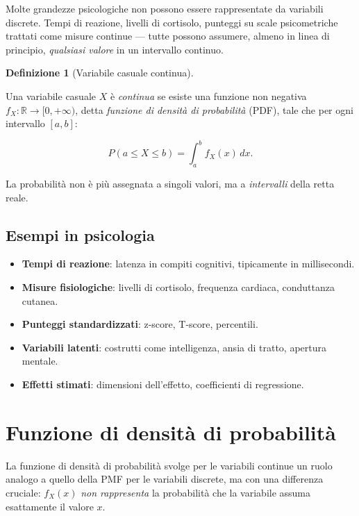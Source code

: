 \documentclass[
  italian,
  letterpaper,
  a4paper,
  11pt,
  open=any]{scrbook}
\providecommand{\tightlist}{%
  \setlength{\itemsep}{0pt}\setlength{\parskip}{0pt}}
\theoremstyle{plain}
\theoremstyle{definition}
\theoremstyle{definition}
\newtheorem{definition}{Definizione}[chapter]
\theoremstyle{remark}
\begin{document}
Molte grandezze psicologiche non possono essere rappresentate da
variabili discrete. Tempi di reazione, livelli di cortisolo, punteggi su
scale psicometriche trattati come misure continue --- tutte possono
assumere, almeno in linea di principio, \emph{qualsiasi valore} in un
intervallo continuo.

\begin{definition}[Variabile casuale
continua]\protect\hypertarget{def-continuous-rv}{}\label{def-continuous-rv}

Una variabile casuale \(X\) è \emph{continua} se esiste una funzione non
negativa \(f_X : \mathbb{R} \to [0, +\infty)\), detta \emph{funzione di
densità di probabilità} (PDF), tale che per ogni intervallo \([a,b]\):

\[
P(a \leq X \leq b) = \int_a^b f_X(x)\,dx.
\]

\end{definition}

La probabilità non è più assegnata a singoli valori, ma a
\emph{intervalli} della retta reale.

\subsection{Esempi in psicologia}\label{esempi-in-psicologia-1}

\begin{itemize}
\tightlist
\item
  \textbf{Tempi di reazione}: latenza in compiti cognitivi, tipicamente
  in millisecondi.
\item
  \textbf{Misure fisiologiche}: livelli di cortisolo, frequenza
  cardiaca, conduttanza cutanea.
\item
  \textbf{Punteggi standardizzati}: z-score, T-score, percentili.
\item
  \textbf{Variabili latenti}: costrutti come intelligenza, ansia di
  tratto, apertura mentale.
\item
  \textbf{Effetti stimati}: dimensioni dell'effetto, coefficienti di
  regressione.
\end{itemize}

\section{Funzione di densità di probabilità}\label{sec-pdf}

La funzione di densità di probabilità svolge per le variabili continue
un ruolo analogo a quello della PMF per le variabili discrete, ma con
una differenza cruciale: \(f_X(x)\) \emph{non rappresenta} la
probabilità che la variabile assuma esattamente il valore \(x\).
\end{document}
